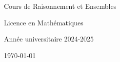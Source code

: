 \begin{titlepage}
    \centering
    \vspace*{1cm}

    \Huge
    Cours de Raisonnement et Ensembles

    \vspace{0.5cm}

    \LARGE
    Licence en Mathématiques

    \vspace{1.5cm}


    \vfill

    \Large
    Année universitaire 2024-2025

    \vspace{0.8cm}

    \today
\end{titlepage}
